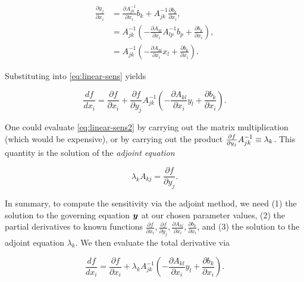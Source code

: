 \documentclass[../primer.tex]{subfiles}
\begin{document}
\begin{equation} \begin{aligned}
  \frac{\partial y_j}{\partial x_i} &= \frac{\partial A^{-1}_{jk}}{\partial x_i}b_k + A^{-1}_{jk}\frac{\partial b_k}{\partial x_i}, \\
  &= A^{-1}_{jk}\left(-\frac{\partial A_{kl}}{\partial x_i}A^{-1}_{lp}b_p+\frac{\partial b_k}{\partial x_i}\right), \\
  &= A^{-1}_{jk}\left(-\frac{\partial A_{kl}}{\partial x_i}x_l+\frac{\partial b_k}{\partial x_i}\right).
\end{aligned} \end{equation}


\noindent Substituting into \eqref{eq:linear-sens} yields

\begin{equation}\label{eq:linear-sens2}
  \frac{df}{dx_i} = \frac{\partial f}{\partial x_i} + \frac{\partial f}{\partial y_j}A^{-1}_{jk}%
  \left(-\frac{\partial A_{kl}}{\partial x_i}y_l + \frac{\partial b_k}{\partial x_i}\right).
\end{equation}

One could evaluate \eqref{eq:linear-sens2} by carrying out the matrix
multiplication (which would be expensive), or by carrying out the product
$\frac{\partial f}{\partial y_j}A^{-1}_{jk}\equiv\nobreak\lambda_k$. This
quantity is the solution of the \emph{adjoint equation}

\begin{equation}\label{eq:linear-adjoint}
  \lambda_k A_{kj} = \frac{\partial f}{\partial y_j}.
\end{equation}

In summary, to compute the sensitivity via the adjoint method, we need (1) the
solution to the governing equation $\boldsymbol{y}$ at our chosen parameter values, (2) the
partial derivatives to known functions $\frac{\partial f}{\partial x_i},
\frac{\partial f}{\partial y_j}, \frac{\partial A_{kl}}{\partial x_i},
\frac{\partial b_k}{\partial x_i}$, and (3) the solution to the adjoint equation
$\lambda_k$. We then evaluate the total derivative via

\begin{equation}
  \frac{df}{dx_i} = \frac{\partial f}{\partial x_i} +
    \lambda_k A^{-1}_{jk}\left(-\frac{\partial A_{kl}}{\partial x_i}y_l +
    \frac{\partial b_k}{\partial x_i}\right).
\end{equation}
\end{document}
